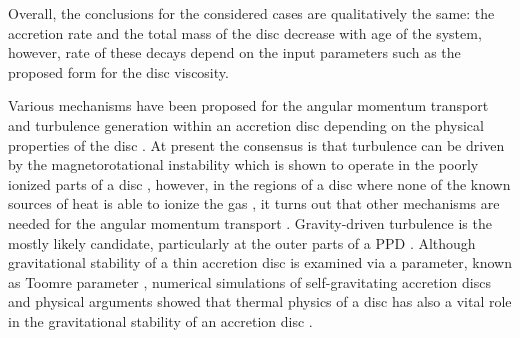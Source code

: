 \documentclass[apj]{emulateapj}
\begin{document}
Overall, the conclusions for the considered cases are qualitatively the same: the accretion rate and the total mass of the disc decrease with age of the system, however, rate of these decays depend on the input parameters such as the proposed form for the disc viscosity. 

Various mechanisms have been proposed for the angular momentum transport and turbulence generation within an accretion disc depending on the physical properties of the disc  \citep[for a review, e.g.,][]{Balbus2003}. At present the consensus is that turbulence can be driven by the magnetorotational instability which is shown to operate in the poorly ionized parts of a disc  \citep{Balbus91}, however, in the regions of a disc where none of the known sources of heat is able to ionize the gas  \citep{gam96}, it turns out that other mechanisms are needed for the angular momentum transport  \citep[e.g.,][]{lin87,Rice2003,rafikov2009,Clarke09,Cossins2010,Martin13,Dong16}. Gravity-driven turbulence is the mostly likely candidate, particularly at the outer parts of a PPD \citep[e.g.,][]{Mat2005,Kratter2008,rice2009,Voro2013,Rafikov15}. Although gravitational stability of a thin accretion disc is examined via a parameter, known as Toomre parameter \citep{Toomre64}, numerical simulations of self-gravitating accretion discs and physical arguments showed that thermal physics of a disc has also a vital role in the gravitational stability of an accretion disc  \citep[][]{gami,Cossins2010,Rice2003,rafikov2009,Cai2010,Rice2014,Tsukamoto15}.
\end{document}
